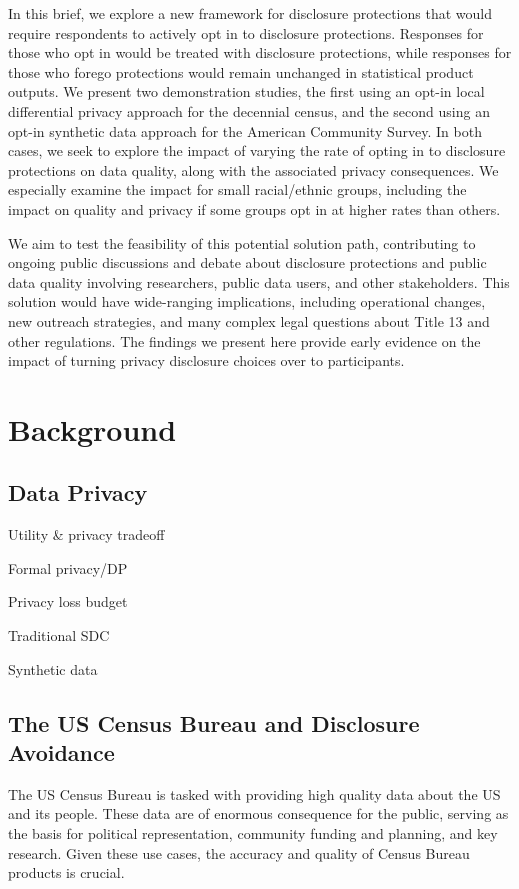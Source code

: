 \documentclass[
]{urban-formatting}
\begin{document}
In this brief, we explore a new framework for disclosure protections
that would require respondents to actively opt in to disclosure
protections. Responses for those who opt in would be treated with
disclosure protections, while responses for those who forego protections
would remain unchanged in statistical product outputs. We present two
demonstration studies, the first using an opt-in local differential
privacy approach for the decennial census, and the second using an
opt-in synthetic data approach for the American Community Survey. In
both cases, we seek to explore the impact of varying the rate of opting
in to disclosure protections on data quality, along with the associated
privacy consequences. We especially examine the impact for small
racial/ethnic groups, including the impact on quality and privacy if
some groups opt in at higher rates than others.

We aim to test the feasibility of this potential solution path,
contributing to ongoing public discussions and debate about disclosure
protections and public data quality involving researchers, public data
users, and other stakeholders. This solution would have wide-ranging
implications, including operational changes, new outreach strategies,
and many complex legal questions about Title 13 and other regulations.
The findings we present here provide early evidence on the impact of
turning privacy disclosure choices over to participants.

\section{Background}

\subsection{Data Privacy}

Utility \& privacy tradeoff

Formal privacy/DP

Privacy loss budget

Traditional SDC

Synthetic data

\subsection{The US Census Bureau and Disclosure Avoidance}

The US Census Bureau is tasked with providing high quality data about
the US and its people. These data are of enormous consequence for the
public, serving as the basis for political representation, community
funding and planning, and key research. Given these use cases, the
accuracy and quality of Census Bureau products is crucial.
\end{document}
